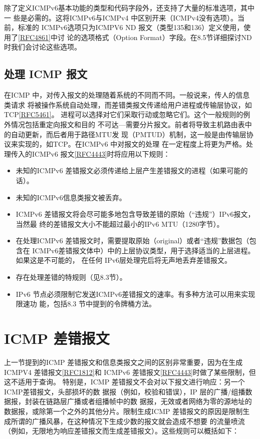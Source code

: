 除了定义ICMPv6基本功能的类型和代码字段外，还支持了大量的标准选项，其中一
些是必需的。这将ICMPv6与ICMPv4 中区别开来（ICMPv4没有选项）。当前，标准的
ICMPv6选项只为ICMPV6 ND
报文（类型135和136）定义使用，使用了\href{https://www.rfc-editor.org/rfc/rfc4861}{[RFC4861]}中讨
论的选项格式（Option Format）字段。在8.5节详细探讨ND 时我们会讨论这些选项。

\subsection{处理 ICMP 报文}
在ICMP 中，对传入报文的处理随着系统的不同而不同。一般说来，传人的信息类请求
将被操作系统自动处理，而差错类报文传递给用户进程或传输层协议，如
TCP\href{https://www.rfc-editor.org/rfc/rfc5461}{[RFC5461]}。
进程可以选择对它们采取行动或忽略它们。这个一般规则的例外情况包括重定向报文和目的
不可达—需要分片报文。前者将导致主机路由表中的自动更新，而后者用于路径MTU发
现（PMTUD）机制，这一般是由传输层协议来实现的，如TCP。在ICMPv6 中对报文的处理
在一定程度上将更为严格。处理传入的ICMPv6
报文\href{https://www.rfc-editor.org/rfc/rfc4443}{[RFC4443]}时将应用以下规则：

\begin{itemize}
  \item 未知的ICMPv6 差错报文必须传递给上层产生差错报文的进程（如果可能的话）。
  \item 未知的ICMPv6信息类报文被丢弃。
  \item ICMPv6 差错报文将会尽可能多地包含导致差错的原始（“违规”）IPv6报文，当然最
    终的差错报文大小不能超过最小的IPv6 MTU（1280字节）。
  \item 在处理ICMPv6 差错报文时，需要提取原始（original）或者“违规”数据包（包含在
    ICMPv6差错报文体中）中的上层协议类型，用于选择适当的上层进程。如果这是不可能的，
    在任何 IPv6层处理完后将无声地丢弃差错报文。
  \item 存在处理差错的特规则（见8.3节）。
  \item IPv6 节点必须限制它发送ICMPv6差错报文的速率。有多种方法可以用来实现限速功
    能，包括8.3 节中提到的令牌桶方法。
\end{itemize}

\section{ICMP 差错报文}

上一节提到的ICMP 差错报文和信息类报文之间的区别非常重要，因为在生成ICMPV4
差错报文\href{https://www.rfc-editor.org/rfc/rfc1812}{[RFC1812]}和 ICMPv6
差错报文\href{https://www.rfc-editor.org/rfc/rfc4443}{[RFC4443]}时做了某些限制，但这不适用于查询。
特别是，ICMP 差错报文不会对以下报文进行响应：另一个ICMP差错报文，头部损坏的数
据报（例如，校验和错误），IP 层的广播/组播数据报，封装在链路层广播或者组播帧中的数
据报，无效或者网络为零的源地址的数据报，或除第一个之外的其他分片。限制生成ICMP
差错报文的原因是限制生成所谓的广播风暴，在这种情况下生成少数的报文就会造成不想要
的流量喷流（例如，无限地为响应差错报文而生成差错报文）。这些规则可以概括如下：

